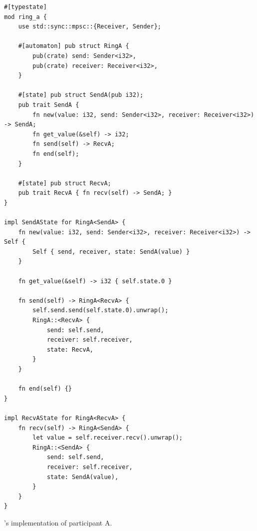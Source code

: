 \begin{listing}
    \begin{verbatim}
#[typestate]
mod ring_a {
    use std::sync::mpsc::{Receiver, Sender};

    #[automaton] pub struct RingA {
        pub(crate) send: Sender<i32>,
        pub(crate) receiver: Receiver<i32>,
    }

    #[state] pub struct SendA(pub i32);
    pub trait SendA {
        fn new(value: i32, send: Sender<i32>, receiver: Receiver<i32>) -> SendA;
        fn get_value(&self) -> i32;
        fn send(self) -> RecvA;
        fn end(self);
    }

    #[state] pub struct RecvA;
    pub trait RecvA { fn recv(self) -> SendA; }
}

impl SendAState for RingA<SendA> {
    fn new(value: i32, send: Sender<i32>, receiver: Receiver<i32>) -> Self {
        Self { send, receiver, state: SendA(value) }
    }

    fn get_value(&self) -> i32 { self.state.0 }

    fn send(self) -> RingA<RecvA> {
        self.send.send(self.state.0).unwrap();
        RingA::<RecvA> {
            send: self.send,
            receiver: self.receiver,
            state: RecvA,
        }
    }

    fn end(self) {}
}

impl RecvAState for RingA<RecvA> {
    fn recv(self) -> RingA<SendA> {
        let value = self.receiver.recv().unwrap();
        RingA::<SendA> {
            send: self.send,
            receiver: self.receiver,
            state: SendA(value),
        }
    }
}
    \end{verbatim}
    \caption{\textcolor{attrgreen}{}'s implementation of participant A.}
    \label{lst:typestate-ring-starter}
\end{listing}

